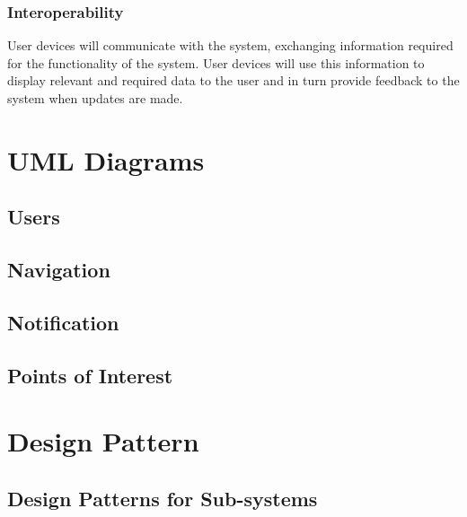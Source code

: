 \documentclass{article}
\begin{document}
		\subsubsection{Interoperability}
		User devices will communicate with the system, exchanging information required for the functionality of the system. User devices will use this information to display relevant and required data to the user and in turn provide feedback to the system when updates are made.

\section{UML Diagrams}
	\subsection{Users}
	
	\subsection{Navigation}
	
	\subsection{Notification}
	
	\subsection{Points of Interest}

\section{Design Pattern}
	\subsection{Design Patterns for Sub-systems}
	
\end{document}
